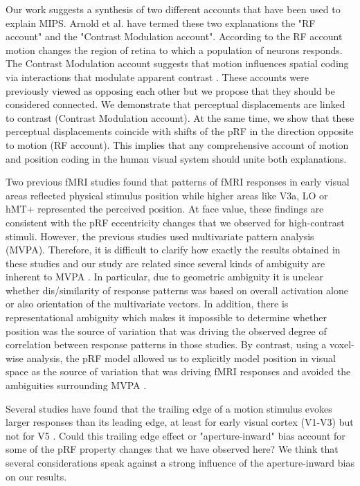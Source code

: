 Our work suggests a synthesis of two different accounts that have been used to explain MIPS. Arnold et al. \parencite*{Arnold2007} have termed these two explanations the "RF account" and the "Contrast Modulation account". According to the RF account motion changes the region of retina to which a population of neurons responds. The Contrast Modulation account suggests that motion influences spatial coding via interactions that modulate apparent contrast \parencite{Arnold2007}. These accounts were previously viewed as opposing each other but we propose that they should be considered connected. We demonstrate that perceptual displacements are linked to contrast (Contrast Modulation account). At the same time, we show that these perceptual displacements coincide with shifts of the pRF in the direction opposite to motion (RF account). This implies that any comprehensive account of motion and position coding in the human visual system should unite both explanations. 

Two previous fMRI studies \parencite{Fischer2011, Maus2013} found that patterns of fMRI responses in early visual areas reflected physical stimulus position while higher areas like V3a, LO or hMT+ represented the perceived position. At face value, these findings are consistent with the pRF eccentricity changes that we observed for high-contrast stimuli. However, the previous studies used multivariate pattern analysis (MVPA). Therefore, it is difficult to clarify how exactly the results obtained in these studies and our study are related since several kinds of ambiguity are inherent to MVPA \parencite{Naselaris2015a}. In particular, due to geometric ambiguity it is unclear whether dis/similarity of response patterns was based on overall activation alone or also orientation of the multivariate vectors. In addition, there is representational ambiguity which makes it impossible to determine whether position was the source of variation that was driving the observed degree of correlation between response patterns in those studies. By contrast, using a voxel-wise analysis, the pRF model allowed us to explicitly model position in visual space as the source of variation that was driving fMRI responses and avoided the ambiguities surrounding MVPA \parencite{Naselaris2015a}. 

Several studies have found that the trailing edge of a motion stimulus evokes larger responses than its leading edge, at least for early visual cortex (V1-V3) \parencite{Whitney2003, Liu2006, Wang2014, Schellekens2016} but not for V5 \parencite{Wang2014}. Could this trailing edge effect or "aperture-inward" bias account for some of the pRF property changes that we have observed here? We think that several considerations speak against a strong influence of the aperture-inward bias on our results.


